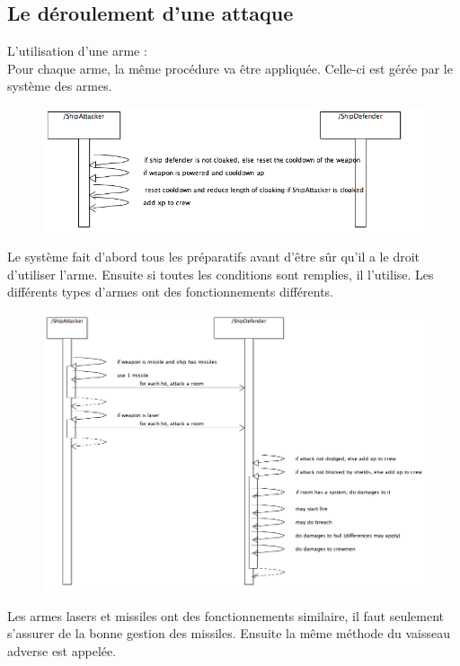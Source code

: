 	
	\subsection{Le déroulement d'une attaque}

		L'utilisation d'une arme :\\
		Pour chaque arme, la même procédure va être appliquée. Celle-ci est gérée par le système des armes.
		\begin{figure}[H]
			\centering
			\includegraphics[width=1\linewidth]{smoothUseWeaponToAttackSequenceDiagramStart}
		\end{figure}
		Le système fait d'abord tous les préparatifs avant d'être sûr qu'il a le droit d'utiliser l'arme. Ensuite si toutes les conditions sont remplies, il l'utilise. Les différents types d'armes ont des fonctionnements différents.
		\begin{figure}[H]
			\centering
			\includegraphics[width=1\linewidth]{smoothUseWeaponToAttackSequenceDiagramMissileLaser}
		\end{figure}
		Les armes lasers et missiles ont des fonctionnements similaire, il faut seulement s'assurer de la bonne gestion des missiles. Ensuite la même méthode du vaisseau adverse est appelée. \\
